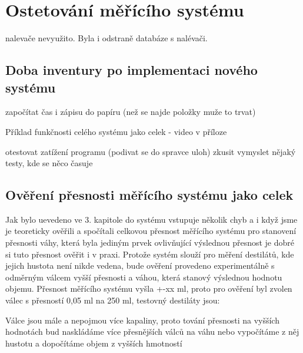 
\chapter{Ostetování měřícího systému}
nalevače
nevyužito. Byla i odstraně databáze s nalévači.


\section{Doba inventury po implementaci nového systému}

započítat čas i zápisu do papíru (než se najde položky muže to trvat)

Příklad funkčnosti celého systému jako celek - video v příloze

otestovat zatížení programu (podivat se do spravce uloh)
zkusit vymyslet nějaký testy, kde se něco časuje

\section{Ověření přesnosti měřícího systému jako celek}

Jak bylo uevedeno ve 3. kapitole do systému vstupuje několik chyb a i když jsme je teoreticky ověřili a spočítali celkovou přesnost měřícího systému pro stanovení přesnosti váhy, která byla jediným prvek ovlivňující výslednou přesnost je dobré si tuto přesnost ověřit i v praxi. Protože systém slouží pro měření destilátů, kde jejich hustota není nikde vedena, bude ověření provedeno experimentálně s odměrným válcem vyšší přesnosti a váhou, která stanový výslednou hodnotu objemu. Přesnost měřícího systému vyšla +-xx ml, proto pro ověření byl zvolen válec s přesností 0,05 ml na 250 ml, testovný destiláty jsou:

Válce jsou mále a nepojmou více kapaliny, proto tování přesnosti na vyšších hodnotách bud naskládáme více přesnějších válců na váhu nebo vypočítáme z něj hustotu a dopočítáme objem z vyšších hmotností